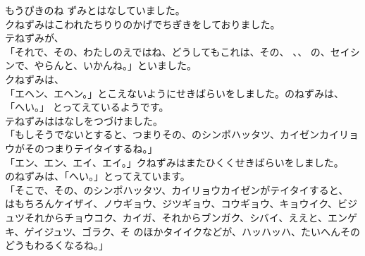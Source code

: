 \documentclass[
    a4paper,
    10pt,
    book]
    {tarticle}
\begin{document}
もうぴきのね
ずみとはなしていました。\\
\indent クねずみはこわれたちりりのかげでちぎきをしておりました。\\
\indent テねずみが、\\
「それで、その、わたしのえではね、どうしてもこれは、その、
、、
の、セイシンで、やらんと、いかんね。」といました。\\
\indent クねずみは、\\
「エヘン、エヘン。」とこえないようにせきばらいをしました。のねずみは、
「へい。」
\newpage
\thispagestyle{fancy}
とってえているようです。\\
\indent テねずみははなしをつづけました。\\
「もしそうでないとすると、つまりその、のシンポハッタツ、カイゼンカイリョウがそのつまりテイタイするね。」\\
「エン、エン、エイ、エイ。」クねずみはまたひくくせきばらいをしました。\\
\indent {}のねずみは、「へい。」とってえています。\\
「そこで、その、のシンポハッタツ、カイリョウカイゼンがテイタイすると、
はもちろんケイザイ、ノウギョウ、ジツギョウ、コウギョウ、キョウイク、ビジュツそれからチョウコク、カイガ、それからブンガク、シバイ、ええと、エンゲキ、ゲイジュツ、ゴラク、そ
のほかタイイクなどが、ハッハッハ、たいへんそのどうもわるくなるね。」
\end{document}
